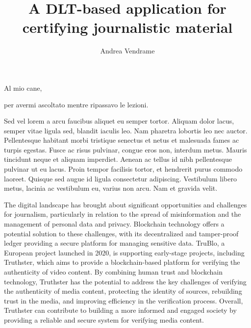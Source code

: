 \documentclass[target=mst,aauheader=]{thud}
\title{A DLT-based application for certifying journalistic material}
\author{Andrea Vendrame}
\begin{document}
\maketitle

\begin{dedication}
	Al mio cane,\par per avermi ascoltato mentre ripassavo le lezioni.
\end{dedication}

\acknowledgements
Sed vel lorem a arcu faucibus aliquet eu semper tortor. Aliquam dolor lacus, semper vitae ligula sed, blandit iaculis leo. Nam pharetra lobortis leo nec auctor. Pellentesque habitant morbi tristique senectus et netus et malesuada fames ac turpis egestas. Fusce ac risus pulvinar, congue eros non, interdum metus. Mauris tincidunt neque et aliquam imperdiet. Aenean ac tellus id nibh pellentesque pulvinar ut eu lacus. Proin tempor facilisis tortor, et hendrerit purus commodo laoreet. Quisque sed augue id ligula consectetur adipiscing. Vestibulum libero metus, lacinia ac vestibulum eu, varius non arcu. Nam et gravida velit.

\abstract

The digital landscape has brought about significant opportunities and challenges for journalism, particularly in relation to the spread of misinformation and the management of personal data and privacy. Blockchain technology offers a potential solution to these challenges, with its decentralized and tamper-proof ledger providing a secure platform for managing sensitive data. TruBlo, a European project launched in 2020, is supporting early-stage projects, including Truthster, which aims to provide a blockchain-based platform for verifying the authenticity of video content. By combining human trust and blockchain technology, Truthster has the potential to address the key challenges of verifying the authenticity of media content, protecting the identity of sources, rebuilding trust in the media, and improving efficiency in the verification process. Overall, Truthster can contribute to building a more informed and engaged society by providing a reliable and secure system for verifying media content.
\tableofcontents

\listoftables

\listoffigures



\mainmatter
\end{document}
